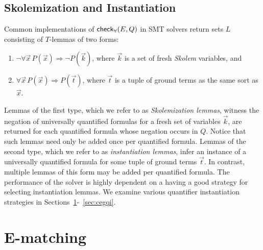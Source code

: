 \documentclass[oribibl]{llncs}
\begin{document}
\subsection{Skolemization and Instantiation}
Common implementations of $\small\mathsf{check}_\forall( E, Q )$ in SMT solvers return sets $L$ consisting of $T$-lemmas of two forms:
\begin{enumerate}
\item $\neg \forall \vec x\, P( \vec x ) \Rightarrow \neg P( \vec k )$, where $\vec k$ is a set of fresh \emph{Skolem} variables, and
\item $\forall \vec x\, P( \vec x ) \Rightarrow P( \vec t )$, where $\vec t$ is a tuple of ground terms as the same sort as $\vec x$.
\end{enumerate}
Lemmas of the first type, which we refer to as \emph{Skolemization lemmas},
 witness the negation of universally quantified formulas for a fresh set of variables $\vec{k}$,
are returned for each quantified formula whose negation occurs in $Q$.
Notice that such lemmas need only be added once per quantified formula.
Lemmas of the second type, which we refer to as \emph{instantiation lemmas},
infer an instance of a universally quantified formula for some tuple of ground terms $\vec{ t }$.
In contrast, multiple lemmas of this form may be added per quantified formula.
The performance of the solver is highly dependent on a having a good strategy for selecting instantiation lemmas.
We examine various quantifier instantiation strategies in Sections~\ref{sec:ematching}-~\ref{sec:cegqi}.

\section{E-matching}
\label{sec:ematching}
\end{document}
